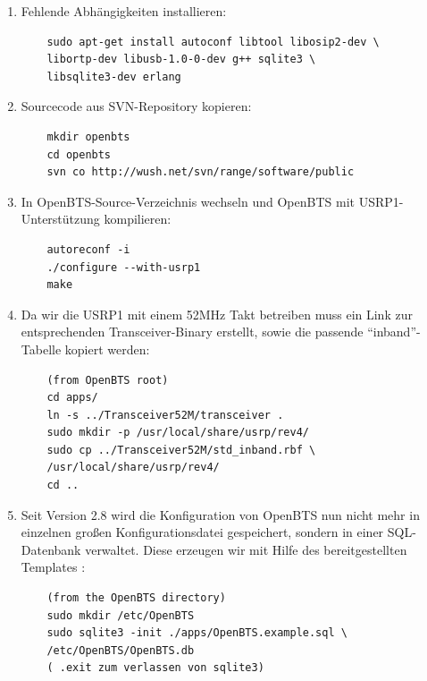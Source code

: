 \begin{enumerate}
	\item Fehlende Abhängigkeiten installieren:
	\begin{verbatim}
	sudo apt-get install autoconf libtool libosip2-dev \
	libortp-dev libusb-1.0-0-dev g++ sqlite3 \
	libsqlite3-dev erlang
	\end{verbatim}
	\item Sourcecode aus SVN-Repository kopieren:
	\begin{verbatim}
	mkdir openbts
	cd openbts
	svn co http://wush.net/svn/range/software/public
	\end{verbatim}
	\item In OpenBTS-Source-Verzeichnis wechseln und OpenBTS mit USRP1-Unterstützung kompilieren:
	\begin{verbatim}
	autoreconf -i
	./configure --with-usrp1
	make
	\end{verbatim}
	\item Da wir die USRP1 mit einem 52MHz Takt betreiben muss ein Link zur entsprechenden Transceiver-Binary erstellt, sowie die passende "`inband"'-Tabelle kopiert werden:
	\begin{verbatim}
	(from OpenBTS root)
	cd apps/
	ln -s ../Transceiver52M/transceiver .
	sudo mkdir -p /usr/local/share/usrp/rev4/
	sudo cp ../Transceiver52M/std_inband.rbf \
	/usr/local/share/usrp/rev4/
	cd ..
	\end{verbatim}
	\item Seit Version 2.8 wird die Konfiguration von OpenBTS nun nicht mehr in einzelnen großen Konfigurationsdatei gespeichert, sondern in einer SQL-Datenbank verwaltet. Diese erzeugen wir mit Hilfe des bereitgestellten Templates :
	\begin{verbatim}
	(from the OpenBTS directory)
	sudo mkdir /etc/OpenBTS
	sudo sqlite3 -init ./apps/OpenBTS.example.sql \
	/etc/OpenBTS/OpenBTS.db
	( .exit zum verlassen von sqlite3)
	\end{verbatim}
\end{enumerate}

